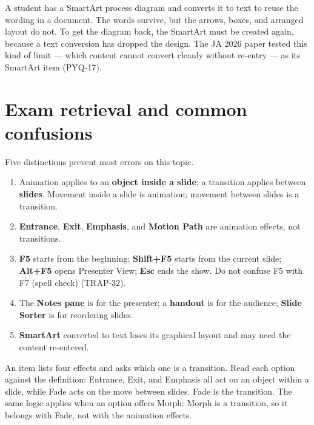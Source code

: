 \begin{example}
A student has a SmartArt process diagram and converts it to text to reuse the
wording in a document. The words survive, but the arrows, boxes, and arranged
layout do not. To get the diagram back, the SmartArt must be created again,
because a text conversion has dropped the design. The JA 2026 paper tested this
kind of limit --- which content cannot convert cleanly without re-entry --- as
its SmartArt item (PYQ-17).
\end{example}

\section{Exam retrieval and common confusions}
Five distinctions prevent most errors on this topic.
\begin{enumerate}
  \item Animation applies to an \textbf{object inside a slide}; a transition
    applies between \textbf{slides}. Movement inside a slide is animation;
    movement between slides is a transition.
  \item \textbf{Entrance}, \textbf{Exit}, \textbf{Emphasis}, and
    \textbf{Motion Path} are animation effects, not transitions.
  \item \textbf{F5} starts from the beginning; \textbf{Shift+F5} starts from
    the current slide; \textbf{Alt+F5} opens Presenter View; \textbf{Esc} ends
    the show. Do not confuse F5 with F7 (spell check) (TRAP-32).
  \item The \textbf{Notes pane} is for the presenter; a \textbf{handout} is for
    the audience; \textbf{Slide Sorter} is for reordering slides.
  \item \textbf{SmartArt} converted to text loses its graphical layout and may
    need the content re-entered.
\end{enumerate}

\begin{example}
An item lists four effects and asks which one is a transition. Read each
option against the definition: Entrance, Exit, and Emphasis all act on an
object within a slide, while Fade acts on the move between slides. Fade is the
transition. The same logic applies when an option offers Morph: Morph is a
transition, so it belongs with Fade, not with the animation effects.
\end{example}

